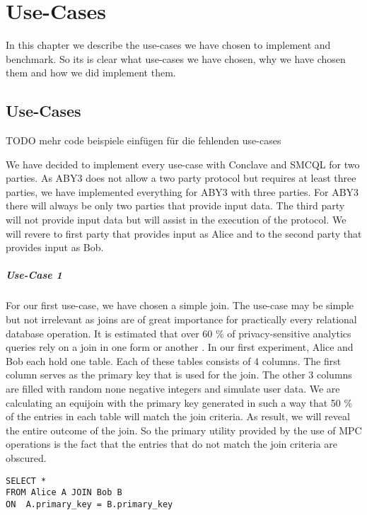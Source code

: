 \chapter{Use-Cases}
In this chapter we describe the use-cases we have chosen to implement and benchmark. So its is clear what use-cases we have chosen, why we have chosen them and how we did implement them. 



\section{Use-Cases} TODO mehr code beispiele einfügen für die fehlenden use-cases

We have decided to implement every use-case with Conclave and SMCQL for two parties. As ABY3 does not allow a two party protocol but requires at least three parties, we have implemented everything for ABY3 with three parties. For ABY3 there will always be only two parties that provide input data. The third party will not provide input data but will assist in the execution of the protocol. We will revere to first party that provides input as Alice and to the second party that provides input as Bob. 
\paragraph{Use-Case 1}
For our first use-case, we have chosen a simple join. The use-case may be simple but not irrelevant as joins are of great importance for practically every relational database operation. It is estimated that over 60 \% of privacy-sensitive analytics queries rely on a join in one form or another \cite{johnson2017practical}. In our first experiment, Alice and Bob each hold one table. Each of these tables consists of 4 columns. The first column serves as the primary key that is used for the join. The other 3 columns are filled with random none negative integers and simulate user data. We are calculating an equijoin with the primary key generated in such a way that 50 \% of the entries in each table will match the join criteria. As result, we will reveal the entire outcome of the join. So the primary utility provided by the use of MPC operations is the fact that the entries that do not match the join criteria are obscured.

\label{SQL1_label}				
\begin{lstlisting}[caption={ Functional equivalent SQL statement for our first use-case  }]
SELECT * 
FROM Alice A JOIN Bob B 
ON  A.primary_key = B.primary_key
\end{lstlisting}
\label{SQL1}
			
